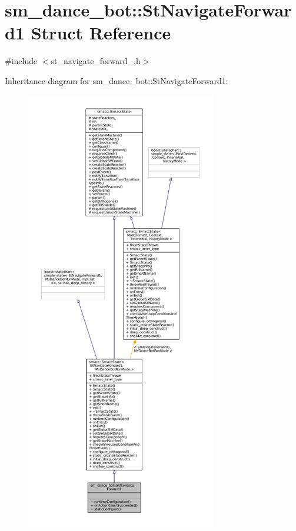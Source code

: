 \hypertarget{structsm__dance__bot_1_1StNavigateForward1}{}\section{sm\+\_\+dance\+\_\+bot\+:\+:St\+Navigate\+Forward1 Struct Reference}
\label{structsm__dance__bot_1_1StNavigateForward1}


{\ttfamily \#include $<$st\+\_\+navigate\+\_\+forward\+\_.\+h$>$}



Inheritance diagram for sm\+\_\+dance\+\_\+bot\+:\+:St\+Navigate\+Forward1\+:
\nopagebreak
\begin{figure}[H]
\begin{center}
\leavevmode
\includegraphics[height=550pt]{structsm__dance__bot_1_1StNavigateForward1__inherit__graph}
\end{center}
\end{figure}


